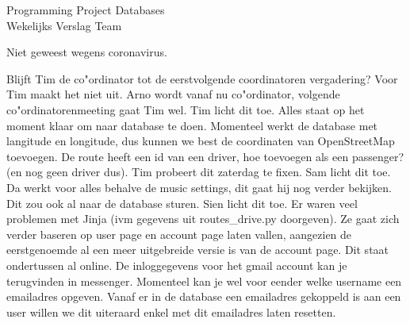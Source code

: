 \documentclass{article}
\newcounter{team}
\begin{document}

	\begin{Minutes}{Programming Project Databases \\ Wekelijks Verslag Team }
		\missingNoExcuse{/}
		\missingExcused{/}

		\maketitle

		Niet geweest wegens coronavirus.





				    Blijft Tim de co"ordinator tot de eerstvolgende coordinatoren vergadering? Voor Tim maakt het niet uit. Arno wordt vanaf nu co"ordinator, volgende co"ordinatorenmeeting gaat Tim wel.
				    Tim licht dit toe. Alles staat op het moment klaar om naar database te doen. Momenteel werkt de database met langitude en longitude, dus kunnen we best de coordinaten van OpenStreetMap toevoegen. De route heeft een id van een driver, hoe toevoegen als een passenger? (en nog geen driver dus). Tim probeert dit zaterdag te fixen.
			        Sam licht dit toe. Da werkt voor alles behalve de music settings, dit gaat hij nog verder bekijken. Dit zou ook al naar de database sturen.
			        Sien licht dit toe. Er waren veel problemen met Jinja (ivm gegevens uit routes_drive.py doorgeven). Ze gaat zich verder baseren op user page en account page laten vallen, aangezien de eerstgenoemde al een meer uitgebreide versie is van de account page.
			        Dit staat ondertussen al online. De inloggegevens voor het gmail account kan je terugvinden in messenger. Momenteel kan je wel voor eender welke username een emailadres opgeven. Vanaf er in de database een emailadres gekoppeld is aan een user willen we dit uiteraard enkel met dit emailadres laten resetten.


\end{Minutes}
\end{document}
